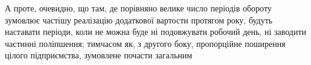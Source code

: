 А проте, очевидно, що там, де порівняно велике число періодів обороту
зумовлює частішу реалізацію додаткової вартости протягом року,
будуть наставати періоди, коли не можна буде ні подовжувати робочий
день, ні заводити частинні поліпшення; тимчасом як, з другого боку, пропорційне
поширення цілого підприємства, зумовлене почасти загальним
\parbreak{}  %
